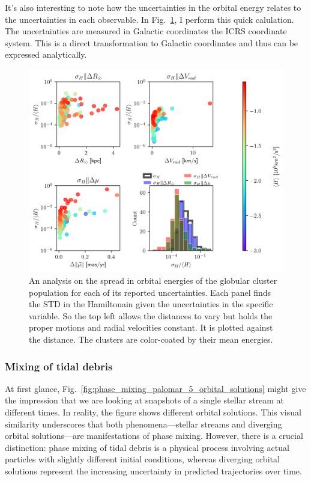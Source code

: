             It's also interesting to note how the uncertainties in the orbital energy relates to the uncertainties in each observable. In Fig.~\ref{fig:energy_sensitivity_analysis_MWGCS_to_distance_RV_mu}, I perform this quick calulation. The uncertainties are measured in Galactic coordinates the ICRS coordinate system. This is a direct transformation to Galactic coordinates and thus can be expressed analytically.

            \begin{figure}[p]
                \includegraphics[width=\linewidth]{images/energy_sensitivity_analysis_MWGCS_to_errors.png}
                \caption{An analysis on the spread in orbital energies of the globular cluster population for each of its reported uncertainties. Each panel finds the STD in the Hamiltonain given the uncertainties in the specific variable. So the top left allows the distances to vary but holds the proper motions and radial velocities constant. It is plotted against the distance. The clusters are color-coated by their mean energies.}
                \label{fig:energy_sensitivity_analysis_MWGCS_to_distance_RV_mu}
            \end{figure}

        \subsubsection{Mixing of tidal debris}
            At first glance, Fig.~\ref{fig:phase_mixing_palomar_5_orbital_solutions} might give the impression that we are looking at snapshots of a single stellar stream at different times. In reality, the figure shows different orbital solutions. This visual similarity underscores that both phenomena—stellar streams and diverging orbital solutions—are manifestations of phase mixing. However, there is a crucial distinction: phase mixing of tidal debris is a physical process involving actual particles with slightly different initial conditions, whereas diverging orbital solutions represent the increasing uncertainty in predicted trajectories over time.

